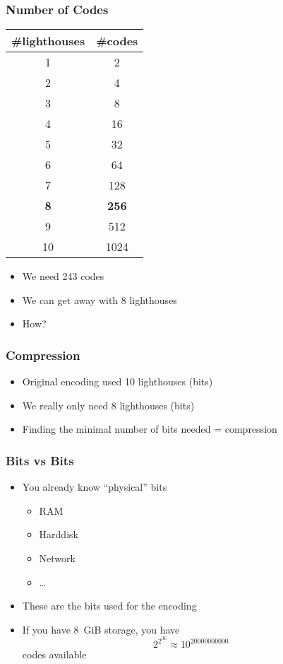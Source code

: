 \begin{frame}
  \frametitle{Number of Codes}
  \begin{center}
    \begin{tabular}{cc}
      \textbf{\#lighthouses} & \textbf{\#codes} \\
      \toprule
      1 & 2 \\
      2 & 4 \\
      3 & 8 \\
      4 & 16 \\
      5 & 32 \\
      6 & 64 \\
      7 & 128 \\
      \bf 8 & \bf 256 \\
      9 & 512 \\
      10 & 1024 \\
      \bottomrule
    \end{tabular}
  \end{center}
  \begin{itemize}
    \item We need 243 codes
    \item We can get away with 8 lighthouses
    \item How? \cake
  \end{itemize}
\end{frame}

\begin{frame}
  \frametitle{Compression}
  \begin{itemize}
    \item Original encoding used 10 lighthouses (bits)
    \item We really only need 8 lighthouses (bits)
    \item Finding the minimal number of bits needed = compression
  \end{itemize}
\end{frame}

\begin{frame}
  \frametitle{Bits vs Bits}
  \begin{itemize}
    \item You already know ``physical'' bits
          \begin{itemize}
            \item RAM
            \item Harddisk
            \item Network
            \item \dots
          \end{itemize}
    \item These are the bits used for the encoding
    \item If you have \SI{8}{GiB} storage, you have
          \[ 2^{2^{36}} \approx 10^{\SI{20000000000}{}} \]
          codes available
  \end{itemize}
\end{frame}

